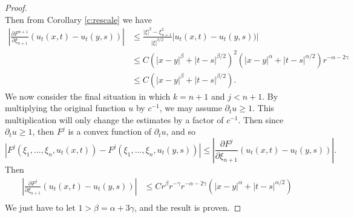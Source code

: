 \documentclass[10pt,a4paper]{amsart}
\begin{document}
\begin{proof}
\[    \]
    Then from Corollary \ref{c:rescale} we have 
    \[
    \begin{aligned}
    \left|\frac{\partial F^{n+1}}{\partial \xi_{n+1}} (u_{t}(x,t) -u_{t}(y,s))\right|
    &\leq  \frac{|\xi|^2 - \xi_{n+1}^2}{|\xi|^{3/2}} |u_{t}(x,t) -u_{t}(y,s))|\\
    &\leq C (|x-y|^{\beta} + |t - s|^{\beta/2})^2 (|x-y|^{\alpha} + |t - s|^{\alpha/2})r^{-\alpha- 2\gamma} \\
    &\leq C (|x-y|^{\beta} + |t - s|^{\beta/2}). 
    \end{aligned}
    \]
    We now consider the final situation in which $k=n+1$ and $j<n+1$. By multiplying the original function $u$ by $c^{-1}$, we may assume $\partial_t u \geq 1$. This multiplication will only change the estimates by a factor of $c^{-1}$. Then  since $\partial_t u \geq 1$, then $F^j$ is a convex function of $\partial_t u$, and so 
    \[
    |F^{j}(\xi_1,\ldots,\xi_n,u_t(x,t))- F^{j}(\xi_1,\ldots,\xi_n,u_t(y,s))|
    \leq \left|\frac{\partial F^{j}}{\partial \xi_{n+1}} (u_{t}(x,t) -u_{t}(y,s))\right|.
    \]
     Then 
    \[
    \begin{aligned}
     \left|\frac{\partial F^{j}}{\partial \xi_{n+1}} (u_{t}(x,t) -u_{t}(y,s)) \right|
     &\leq Cr^{\beta} r^{-\gamma} r^{-\alpha-2\gamma}(|x-y|^{\alpha}+ |t - s|^{\alpha/2}) \\
    \end{aligned}
    \]
    We just have to let $1>\beta=\alpha+3\gamma$, and the result is proven.  
    
     
\end{proof}
\end{document}
